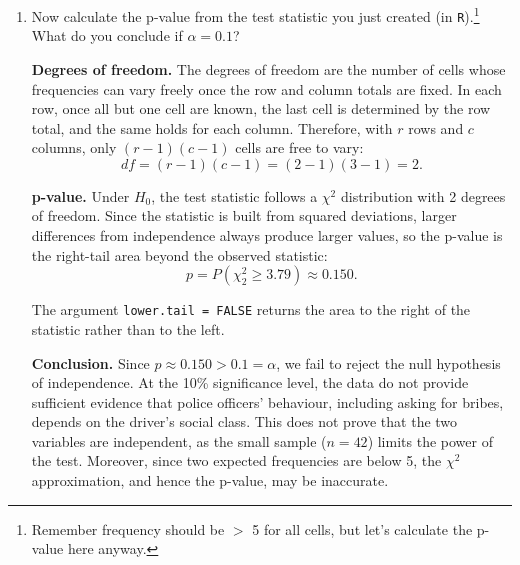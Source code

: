 \documentclass[12pt,letterpaper]{article}
\begin{document}
\begin{enumerate}
		\noindent\textbf{Step 3: test statistic.} The $\chi^2$ statistic sums, over all cells, the squared difference between observed and expected frequencies divided by the expected frequency:
		\begin{equation*}
			\chi^2 = \sum \frac{(f_o - f_e)^2}{f_e}.
		\end{equation*}
		
		
		
		\noindent This gives $\chi^2 \approx 3.79$.
		
		
		\item [(b)]
		Now calculate the p-value from the test statistic you just created (in \texttt{R}).\footnote{Remember frequency should be $>$ 5 for all cells, but let's calculate the p-value here anyway.}  What do you conclude if $\alpha = 0.1$?
		
		\vspace{.25cm}
		\noindent\textbf{Degrees of freedom.} The degrees of freedom are the number of cells whose frequencies can vary freely once the row and column totals are fixed. In each row, once all but one cell are known, the last cell is determined by the row total, and the same holds for each column. Therefore, with $r$ rows and $c$ columns, only $(r-1)(c-1)$ cells are free to vary:
		\begin{equation*}
			df = (r-1)(c-1) = (2-1)(3-1) = 2.
		\end{equation*}
		
		
		
		\noindent\textbf{p-value.} Under $H_0$, the test statistic follows a $\chi^2$ distribution with 2 degrees of freedom. Since the statistic is built from squared deviations, larger differences from independence always produce larger values, so the p-value is the right-tail area beyond the observed statistic:
		\begin{equation*}
			p = P(\chi^2_2 \geq 3.79) \approx 0.150.
		\end{equation*}
		
		
		
		\noindent The argument \texttt{lower.tail = FALSE} returns the area to the right of the statistic rather than to the left.
		
		\vspace{.25cm}
		\noindent\textbf{Conclusion.} Since $p \approx 0.150 > 0.1 = \alpha$, we fail to reject the null hypothesis of independence. At the 10\% significance level, the data do not provide sufficient evidence that police officers' behaviour, including asking for bribes, depends on the driver's social class. This does not prove that the two variables are independent, as the small sample ($n = 42$) limits the power of the test. Moreover, since two expected frequencies are below 5, the $\chi^2$ approximation, and hence the p-value, may be inaccurate.
		

\end{enumerate}
\end{document}
